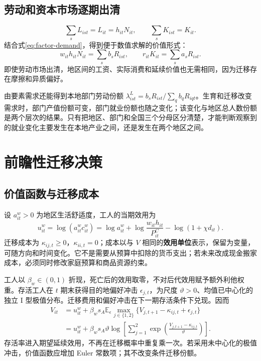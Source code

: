 \documentclass[UTF8,a4paper,zihao=-4,fontset=windows]{ctexart}
\numberwithin{equation}{section}
\newcommand{\E}{\mathbb{E}}
\newcommand{\pc}{P^{C}}
\begin{document}
\subsection{劳动和资本市场逐期出清}
\begin{equation}
 \sum_sL_{ist}=L_{it}=h_{it}N_{it},\qquad
 \sum_sK_{ist}=K_{it}.
 \label{eq:factor-clearing}
\end{equation}
结合式\eqref{eq:factor-demand}，得到便于数值求解的价值形式：
\begin{equation}
 w_{it}h_{it}N_{it}=\sum_sb_sR_{ist},\qquad
 r_{it}K_{it}=\sum_sa_sR_{ist}.
 \label{eq:factor-clearing-value}
\end{equation}
即使劳动市场出清，地区间的工资、实际消费和延续价值也无需相同，因为迁移存在摩擦和异质偏好。

由要素需求还能得到本地部门劳动份额 $\lambda^L_{ist}=b_sR_{ist}/\sum_qb_qR_{iqt}$。生育和迁移改变需求时，部门产值份额可变，部门就业份额也随之变化；该变化与地区总人数份额是两个层次的结果。只有把地区、部门和全国三个分母区分清楚，才能判断观察到的就业变化主要发生在本地产业之间，还是发生在两个地区之间。

\section{前瞻性迁移决策}
\label{sec:migration}

\subsection{价值函数与迁移成本}
设 $a^w_{it}>0$ 为地区生活舒适度，工人的当期效用为
\begin{equation}
 u^w_{it}=\log(a^w_{it}c^w_{it})
 =\log a^w_{it}+\log\frac{w_{it}h_{it}}{\pc_{it}}
 -\log(1+\chi d_{it}).
 \label{eq:worker-flow}
\end{equation}
迁移成本为 $\kappa_{ij,t}\geq0$，$\kappa_{ii,t}=0$；成本以与 $V$ 相同的\textbf{效用单位}表示，保留为变量，可随方向和时间变化。它不是需要从预算中扣除的货币支出；若未来改成现金搬家成本，必须同时修改家庭预算和商品资源约束。

工人以 $\beta_w\in(0,1)$ 折现，死亡后的效用取零，不对后代效用赋予额外利他权重。存活工人在 $t$ 期末获得目的地偏好冲击 $\epsilon_{j,t}$，为尺度 $\vartheta>0$、均值已中心化的独立 I 型极值分布。迁移费用和偏好冲击在下一期存活条件下兑现。因而
\begin{align}
 V_{it}&=u^w_{it}+\beta_ws_A\E_\epsilon
 \max_{j\in\{1,2\}}\{V_{j,t+1}-\kappa_{ij,t}+\epsilon_{j,t}\}\\
 &=u^w_{it}+\beta_ws_A\vartheta
 \log\left[\sum_{j=1}^2
 \exp\left(\frac{V_{j,t+1}-\kappa_{ij,t}}{\vartheta}\right)\right].
 \label{eq:worker-bellman}
\end{align}
存活率进入期望延续效用，不再在迁移概率中重复乘一次。若采用未中心化的极值冲击，价值函数应增加 Euler 常数项；其不改变条件迁移份额。
\end{document}
